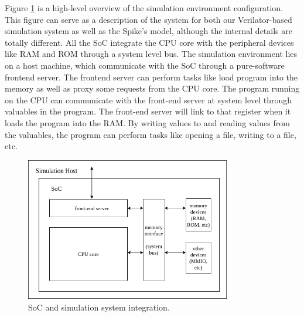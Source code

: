 Figure \ref{fig:450-soc-sys} is a high-level overview of the simulation environment configuration. This figure can serve as a description of the system for both our Verilator-based simulation system as well as the Spike's model, although the internal details are totally different. All the SoC integrate the CPU core with the peripheral devices like RAM and ROM through a system level bus. The simulation environment lies on a host machine, which communicate with the SoC through a pure-software frontend server. The frontend server can perform tasks like load program into the memory as well as proxy some requests from the CPU core. The program running on the CPU can communicate with the front-end server at system level through valuables in the program. The front-end server will link to that register when it loads the program into the RAM. By writing values to and reading values from the valuables, the program can perform tasks like opening a file, writing to a file, etc.

\begin{figure}[!htp]
    \centering
    \includegraphics[width=0.8\textwidth]{figure/450-dr3-sys.png}
    \caption{SoC and simulation system integration.}
    \label{fig:450-soc-sys}
\end{figure}
